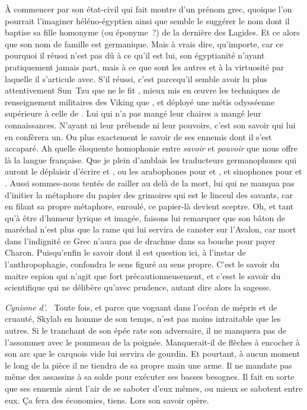 À commencer par son état-civil qui fait montre d’un prénom grec, quoique l’on pourrait l’imaginer héléno-égyptien ainsi que semble le suggérer le nom dont il baptise sa fille homonyme (ou éponyme ?) de la dernière des Lagides. Et ce alors que son nom de famille est germanique. Mais à vrais dire, qu’importe, car ce pourquoi il réussi n’est pas dû à ce qu’il est lui, son égyptianité n’ayant pratiquement jamais part, mais à ce que sont les autres et à la virtuosité par laquelle il s’articule avec. S’il réussi, c’est parcequ’il semble avoir lu plus attentivement Sun~Tzu que ne le fit \reine, mieux mis en œuvre les techniques de renseignement militaires des Viking que \princesse, et déployé une métis odysséenne supérieure à celle de \general. Lui qui n’a pas mangé leur chaires a mangé leur connaissances. N’ayant ni leur prébende ni leur pouvoirs, c’est son savoir qui lui en confèrera un. Ou plus exactement le savoir de ses ennemis dont il s’est accaparé. Ah quelle éloquente homophonie entre \emph{savoir} et \emph{pouvoir} que nous offre là la langue française. Que je plein d’amblais les traducteurs germanophones qui auront le déplaisir d’écrire  et , ou les arabophones pour  et , et sinophones pour  et .
Aussi sommes-nous tentés de railler \general{} au delà de la mort, lui qui ne manqua pas d’initier la métaphore du papier des grimoires qui est le linceul des savants, car en filant sa propre métaphore, enroulé, ce papier-là devient sceptre. Oh, et tant qu’à être d’humeur lyrique et imagée, faisons lui remarquer que son bâton de maréchal n’est plus que la rame qui lui servira de canoter sur l’Avalon, car mort dans l’indignité ce Grec n’aura pas de drachme dans sa bouche pour payer Charon. %
Puisqu’enfin le {savoir} dont il est question ici, à l’instar de l’anthropophagie, confondra le sens figuré au sens propre. C’est le savoir du maitre espion qui n’agit que fort précautionneusement, et c’esst le savoir du scientifique qui ne délibère qu’avec prudence, autant dire alors la sagesse.

{\em\normalsize Cynisme d’\elena{}.}~
Toute fois, et parce que voguant dans l’océan de mépris et de cruauté, \elena{} Skylab en homme de son temps, n’est pas moins intraitable que les autres. Si le tranchant de son épée rate son adversaire, il ne manquera pas de l’assommer avec le pommeau de la poignée. Manquerait-il de flèches à encocher à son arc que le carquois vide lui servira de gourdin. Et pourtant, à aucun moment le long de la pièce il ne tiendra de sa propre main une arme. Il ne mandate pas même des assassins à sa solde pour exécuter ses basses besognes. Il fait en sorte que ses ennemis aient l’air de se saboter d’eux mêmes, ou mieux se sabotent entre eux. Ça fera des économies, tiens. Lors son savoir opère.

